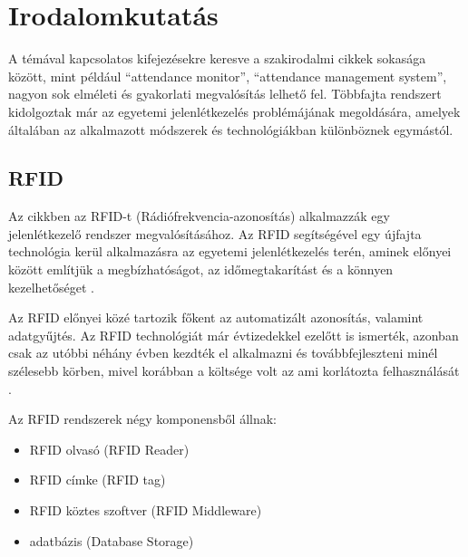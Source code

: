\chapter{Irodalomkutatás} \label{chapter1}

A témával kapcsolatos kifejezésekre keresve a szakirodalmi cikkek sokasága között, mint például \enquote{attendance monitor}, \enquote{attendance management system}, nagyon sok elméleti és gyakorlati megvalósítás lelhető fel. Többfajta rendszert kidolgoztak már az egyetemi jelenlétkezelés problémájának megoldására, amelyek általában az alkalmazott módszerek és technológiákban különböznek egymástól. 

\section{RFID}

Az \cite{1} cikkben az RFID-t (Rádiófrekvencia-azonosítás) alkalmazzák egy jelenlétkezelő rendszer megvalósításához. Az RFID segítségével egy újfajta technológia kerül alkalmazásra az egyetemi jelenlétkezelés terén, aminek előnyei között említjük a megbízhatóságot, az időmegtakarítást és a könnyen kezelhetőséget \cite{3}.

Az RFID előnyei közé tartozik főkent az automatizált azonosítás, valamint adatgyűjtés. Az RFID technológiát már évtizedekkel ezelőtt is ismerték, azonban csak az utóbbi néhány évben kezdték el alkalmazni és továbbfejleszteni minél szélesebb körben, mivel korábban a költsége volt az ami korlátozta felhasználását \cite{2}.

Az RFID rendszerek négy komponensből állnak:
\begin{itemize}
			\item RFID olvasó (RFID Reader)
			\item RFID címke (RFID tag)
			\item RFID köztes szoftver (RFID Middleware)
			\item adatbázis (Database Storage)
\end{itemize}

